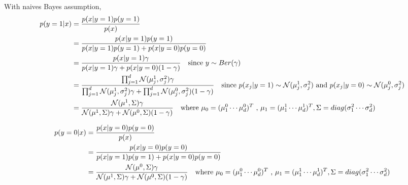 \documentclass{article}
\begin{document}
\subsection{}
\newcommand{\N}{\mathcal{N}}
With naives Bayes assumption,
\begin{equation}
  \label{eq:1.10}
  \begin{split}
    p(y=1 | x) &= \frac{p(x | y=1) p(y=1)}{p(x)} \\
               &= \frac{p(x | y=1) p(y=1)}{p(x | y=1)p(y=1) + p(x | y=0) p(y=0)} \\
               &= \frac{p(x | y=1) \gamma}{p(x | y=1)\gamma + p(x | y=0) (1-\gamma)} \text{\quad since $y \sim Ber(\gamma)$}\\
               &= \frac{\prod_{j=1}^{d} \N(\mu_j^1,\sigma_j^2)\gamma}{\prod_{j=1}^{d} \N(\mu_j^1,\sigma_j^2)\gamma + \prod_{j=1}^{d} \N(\mu_j^0,\sigma_j^2)(1-\gamma)}
                  \text{\quad since $p(x_j|y=1) \sim \N(\mu_j^1,\sigma_j^2)$ and $p(x_j|y=0) \sim \N(\mu_j^0,\sigma_j^2)$}\\
               &= \frac{\N(\mu^1,\Sigma)\gamma}{\N(\mu^1,\Sigma)\gamma + \N(\mu^0,\Sigma)(1-\gamma)}
                  \text{\quad where $\mu_0 = (\mu_1^0 \cdots \mu_d^0)^T $ , $\mu_1 = (\mu_1^1 \cdots \mu_d^1)^T , \Sigma = diag(\sigma_1^2 \cdots \sigma_d^2)$}
  \end{split}
\end{equation}

\begin{equation}
  \label{eq:1.11}
  \begin{split}
    p(y=0 | x) &= \frac{p(x | y=0) p(y=0)}{p(x)} \\
               &= \frac{p(x | y=0) p(y=0)}{p(x | y=1)p(y=1) + p(x | y=0) p(y=0)} \\
               &= \frac{\N(\mu^0,\Sigma)\gamma}{\N(\mu^1,\Sigma)\gamma + \N(\mu^0,\Sigma)(1-\gamma)}
                  \text{\quad where $\mu_0 = (\mu_1^0 \cdots \mu_d^0)^T $ , $\mu_1 = (\mu_1^1 \cdots \mu_d^1)^T , \Sigma = diag(\sigma_1^2 \cdots \sigma_d^2)$}
  \end{split}
\end{equation}
\end{document}
